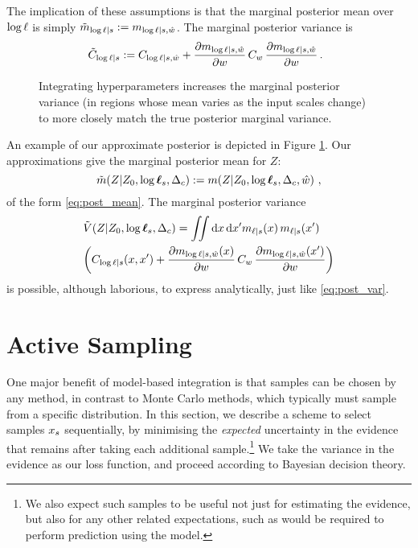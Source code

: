 \documentclass{article}
\begin{document}
The implication of these assumptions is that the marginal posterior mean over $\tr$ is simply
$
\tilde{m}_{\tr|s} \deq m_{\tr|s,\hat{w}}
$.   
The marginal posterior variance is 
\begin{equation}
\hspace{-0.2cm}
\tilde{C}_{\tr|s} 
\deq C_{\tr|s,\hat{w}}
+ 
\pderiv{m_{\tr|s,\hat{w}}}{w}
\,C_w\,
\pderiv{m_{\tr|s,\hat{w}}}{w}\,.
\end{equation}
%
\begin{figure}
\centering
{}
\caption{Integrating hyperparameters increases the marginal posterior variance (in regions whose mean varies as the input scales change) to more closely match the true posterior marginal variance.}
\label{fig:integrate_hypers}
\end{figure}
%
An example of our approximate posterior is depicted in Figure  \ref{fig:integrate_hypers}.
Our approximations give the marginal posterior mean for $Z$:
\begin{equation}
\tilde{m}(\If|Z_0,\tvr_s,\Delta_c) \deq \mean{\If}{Z_0,\tvr_s,\Delta_c, \hat{w}}\,,
\end{equation}
of the form \eqref{eq:post_mean}. The marginal posterior variance
\begin{align}
& \tilde{V}(\If|Z_0,\tvr_s,\Delta_c)=
 \iint  \ud \lfv\, \ud\lfv' m_{\lfn|s}(\lfv)\, m_{\lfn|s}(\lfv')\nonumber\\
&  
\biggl(C_{\tr|s}(\lfv,\lfv') + 
\pderiv{m_{\tr|s,\hat{w}}(x)}{w}
\,C_w\,
\pderiv{m_{\tr|s,\hat{w}}(x')}{w}
\biggr)
\end{align}
is possible, although laborious, to express analytically, just like \eqref{eq:post_var}. 


\section{Active Sampling}\label{sec:BBQ}

One major benefit of model-based integration is that samples can be chosen by any method, in contrast to Monte Carlo methods, which typically must sample from a specific distribution.  In this section, we describe a scheme to select samples $\lfv_s$ sequentially, by minimising the \textit{expected} uncertainty in the evidence that remains after taking each additional sample.\footnote{We also expect such samples to be useful not just for estimating the evidence, but also for any other related expectations, such as would be required to perform prediction using the model.} We take the variance in the evidence as our loss function, and proceed according to Bayesian decision theory.
\end{document}
